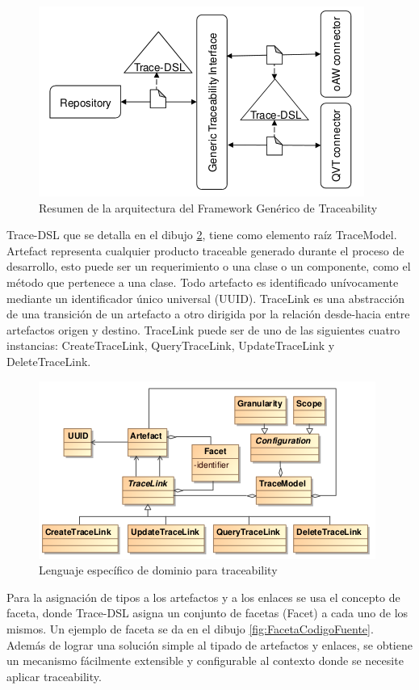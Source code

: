 \documentclass[a4paper,12pt,oneside,spanish]{book}
\begin{document}
\begin{figure}[hbtp]
\centering
\includegraphics[scale=.7]{./img/GenericTraceFrame_Arquitectura}
\caption{Resumen de la arquitectura del Framework Genérico de Traceability}
\label{fig:GenericoArquitectura}
\end{figure}


Trace-DSL que se detalla en el dibujo \ref{fig:DSLTrace}, tiene como elemento raíz TraceModel. Artefact representa cualquier producto traceable generado durante el proceso de desarrollo, esto puede ser un requerimiento o una clase o un componente, como el método que pertenece a una clase. Todo artefacto es identificado unívocamente mediante un identificador único universal (UUID). TraceLink es una abstracción de una transición de un artefacto a otro dirigida por la relación desde-hacia entre artefactos origen y destino. TraceLink puede ser de uno de las siguientes cuatro instancias: CreateTraceLink, QueryTraceLink, UpdateTraceLink y DeleteTraceLink.


\begin{figure}[hbtp]
\centering
\includegraphics[scale=.8]{./img/Trace-DSL}
\caption{Lenguaje específico de dominio para traceability}
\label{fig:DSLTrace}
\end{figure}

Para la asignación de tipos a los artefactos y a los enlaces se usa el concepto de faceta, donde Trace-DSL asigna un conjunto de facetas (Facet) a cada uno de los mismos. Un ejemplo de faceta se da en el dibujo \ref{fig:FacetaCodigoFuente}. Además de lograr una solución simple al tipado de artefactos y enlaces, se obtiene un mecanismo fácilmente extensible y configurable al contexto donde se necesite aplicar traceability.
\end{document}
